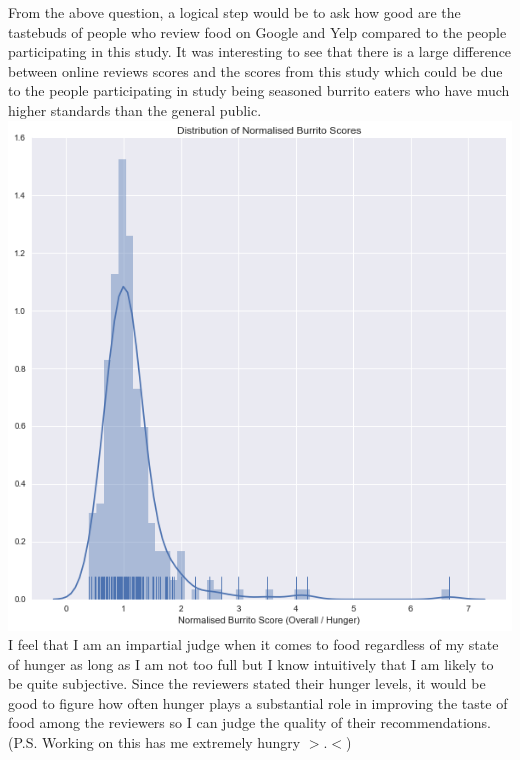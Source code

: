 \documentclass[twoside]{homework}
\begin{document}
From the above question, a logical step would be to ask how good are the tastebuds of people who review food on Google and Yelp compared to the people participating in this study. It was interesting to see that there is a large difference between online reviews scores and the scores from this study which could be due to the people participating in study being seasoned burrito eaters who have much higher standards than the general public. 
\\
\includegraphics[scale=0.8]{5c}
I feel that I am an impartial judge when it comes to food regardless of my state of hunger as long as I am not too full but I know intuitively that I am likely to be quite subjective. Since the reviewers stated their hunger levels, it would be good to figure how often hunger plays a substantial role in improving the taste of food among the reviewers so I can judge the quality of their recommendations. 
\newline \\
(P.S. Working on this has me extremely hungry $>.<$)
\end{document}
